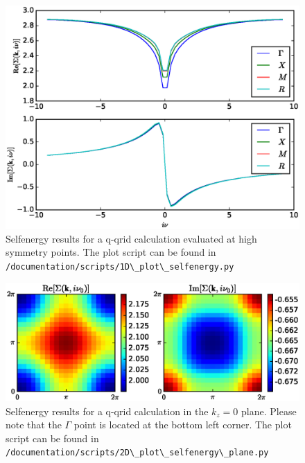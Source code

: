 \documentclass[a4paper,11pt]{article}
\numberwithin{equation}{section} %
\begin{document}
\begin{figure}[H]
\begin{center}
\includegraphics[scale=0.75]{qgrid.eps}
\caption{Selfenergy results for a q-qrid calculation evaluated at high symmetry points. The plot script can be found in {\color{blue}\protect\Verb+/documentation/scripts/1D\_plot\_selfenergy.py+}}
\end{center}
\end{figure}

\begin{figure}[H]
\begin{center}
\includegraphics[clip, trim=0cm 3cm 0cm 3cm, scale=0.75]{qgrid_plane.eps}
\caption{Selfenergy results for a q-qrid calculation in the $k_z=0$ plane. Please note that the $\Gamma$ point is located at the bottom left corner. The plot script can be found in {\color{blue}\protect\Verb+/documentation/scripts/2D\_plot\_selfenergy\_plane.py+}}
\end{center}
\end{figure}

\newpage
\end{document}
